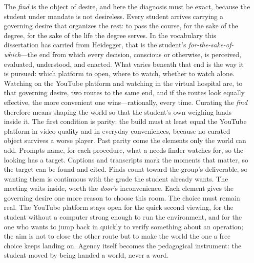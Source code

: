 The \textit{find} is the object of desire, and here the diagnosis must
be exact, because the student under mandate is not desireless. Every
student arrives carrying a governing desire that organizes the rest:
to pass the course, for the sake of the degree, for the sake of the
life the degree serves. In the vocabulary this dissertation has
carried from Heidegger, that is the student's
\textit{for-the-sake-of-which}---the end from which every decision,
conscious or otherwise, is perceived, evaluated, understood, and
enacted. What varies beneath that end is the way it is pursued: which
platform to open, where to watch, whether to watch alone. Watching on
the YouTube platform and watching in the virtual hospital are, to that
governing desire, two routes to the same end, and if the routes look
equally effective, the more convenient one wins---rationally, every
time. Curating the \textit{find} therefore means shaping the world so
that the student's own weighing lands inside it. The first condition
is parity: the build must at least equal the YouTube platform in video
quality and in everyday conveniences, because no curated object
survives a worse player. Past parity come the elements only the world
can add. Prompts name, for each procedure, what a needs-finder watches
for, so the looking has a target. Captions and transcripts mark the
moments that matter, so the target can be found and cited. Finds count
toward the group's deliverable, so wanting them is continuous with the
grade the student already wants. The meeting waits inside, worth the
\textit{door}'s inconvenience. Each element gives the governing desire
one more reason to choose this room. The choice
must remain real. The YouTube platform stays open for the quick second
viewing, for the student without a computer strong enough to run the
environment, and for the one who wants to jump back in quickly to
verify something about an operation; the aim is not to close the other
route but to make the world the one a free choice keeps landing on.
Agency itself becomes the pedagogical instrument: the student moved by
being handed a world, never a word.

